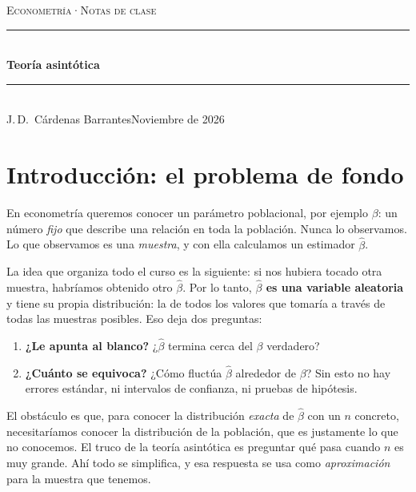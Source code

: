 \documentclass[11pt,a4paper]{article}
\theoremstyle{plain}
\theoremstyle{definition}
\theoremstyle{remark}
\begin{document}
\thispagestyle{plain}

\begin{center}
  {\small\scshape Econometría\enspace·\enspace Notas de clase}\\[4pt]
  \rule{\textwidth}{0.6pt}\\[10pt]
  {\LARGE\bfseries Teoría asintótica}\\[6pt]
  \rule{\textwidth}{0.6pt}\\[4pt]
  {\small J.\,D.\ Cárdenas Barrantes\hfill Noviembre de 2026}
\end{center}

\vspace{1em}
{\small\tableofcontents}
\newpage

\section{Introducción: el problema de fondo}

En econometría queremos conocer un parámetro poblacional, por ejemplo $\beta$: un número
\emph{fijo} que describe una relación en toda la población. Nunca lo observamos. Lo que
observamos es una \emph{muestra}, y con ella calculamos un estimador $\hat\beta$.

La idea que organiza todo el curso es la siguiente: si nos hubiera tocado otra muestra,
habríamos obtenido otro $\hat\beta$. Por lo tanto, \textbf{$\hat\beta$ es una variable aleatoria}
y tiene su propia distribución: la de todos los valores que tomaría a través de todas las
muestras posibles. Eso deja dos preguntas:

\begin{enumerate}
  \item \textbf{¿Le apunta al blanco?} ¿$\hat\beta$ termina cerca del $\beta$ verdadero?
  \item \textbf{¿Cuánto se equivoca?} ¿Cómo fluctúa $\hat\beta$ alrededor de $\beta$? Sin esto no
        hay errores estándar, ni intervalos de confianza, ni pruebas de hipótesis.
\end{enumerate}

El obstáculo es que, para conocer la distribución \emph{exacta} de $\hat\beta$ con un $n$
concreto, necesitaríamos conocer la distribución de la población, que es justamente lo que
no conocemos. El truco de la teoría asintótica es preguntar qué pasa cuando $n$ es muy
grande. Ahí todo se simplifica, y esa respuesta se usa como \emph{aproximación} para la
muestra que tenemos.
\end{document}
